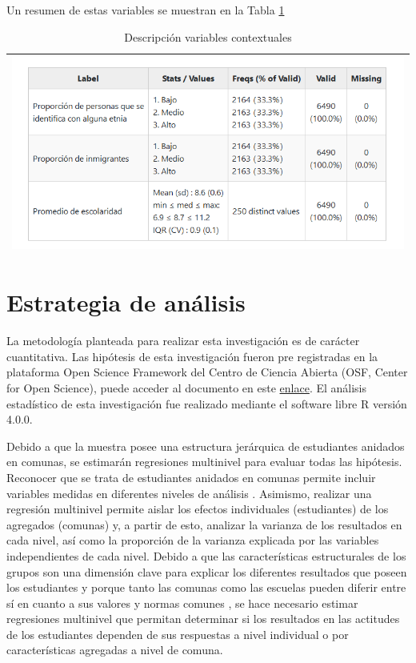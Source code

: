 \documentclass[12pt,twoside]{templates/facsothesis}
\begin{document}
Un resumen de estas variables se muestran en la Tabla \ref{tab:desc03}

\begin{longtable}[]{@{}l@{}}
\caption{\label{tab:desc03}Descripción variables contextuales}\tabularnewline
\toprule()
\endhead
\includegraphics{IPO/output/tables/desc03.png} \\
\bottomrule()
\end{longtable}

\hypertarget{estrategia-de-anuxe1lisis}{%
\section{Estrategia de análisis}\label{estrategia-de-anuxe1lisis}}

La metodología planteada para realizar esta investigación es de carácter cuantitativa. Las hipótesis de esta investigación fueron pre registradas en la plataforma Open Science Framework del Centro de Ciencia Abierta (OSF, Center for Open Science), puede acceder al documento en este \href{https://doi.org/10.17605/OSF.IO/URPZQ}{enlace}. El análisis estadístico de esta investigación fue realizado mediante el software libre R versión 4.0.0.

Debido a que la muestra posee una estructura jerárquica de estudiantes anidados en comunas, se estimarán regresiones multinivel para evaluar todas las hipótesis. Reconocer que se trata de estudiantes anidados en comunas permite incluir variables medidas en diferentes niveles de análisis \citep{aguinis_BestPractice_2013}. Asimismo, realizar una regresión multinivel permite aislar los efectos individuales (estudiantes) de los agregados (comunas) y, a partir de esto, analizar la varianza de los resultados en cada nivel, así como la proporción de la varianza explicada por las variables independientes de cada nivel. Debido a que las características estructurales de los grupos son una dimensión clave para explicar los diferentes resultados que poseen los estudiantes \citep{trevino_Influence_2018} y porque tanto las comunas como las escuelas pueden diferir entre sí en cuanto a sus valores y normas comunes \citep{bayramozdemir_How_2020}, se hace necesario estimar regresiones multinivel que permitan determinar si los resultados en las actitudes de los estudiantes dependen de sus respuestas a nivel individual o por características agregadas a nivel de comuna.
\end{document}
